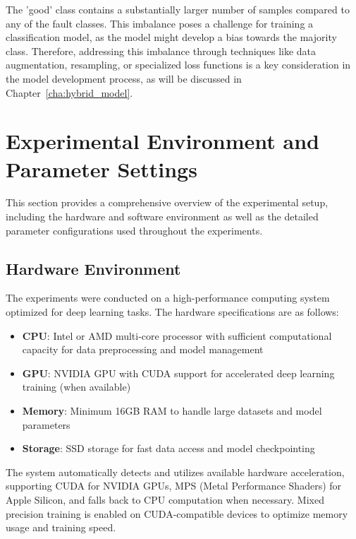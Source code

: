 The 'good' class contains a substantially larger number of samples compared to any of the fault classes. This imbalance poses a challenge for training a classification model, as the model might develop a bias towards the majority class. Therefore, addressing this imbalance through techniques like data augmentation, resampling, or specialized loss functions is a key consideration in the model development process, as will be discussed in Chapter~\ref{cha:hybrid_model}.

\section{Experimental Environment and Parameter Settings}
\label{sec:experiments:environment_parameters}

This section provides a comprehensive overview of the experimental setup, including the hardware and software environment as well as the detailed parameter configurations used throughout the experiments.

\subsection{Hardware Environment}
\label{subsec:hardware_environment}

The experiments were conducted on a high-performance computing system optimized for deep learning tasks. The hardware specifications are as follows:

\begin{itemize}
    \item \textbf{CPU}: Intel or AMD multi-core processor with sufficient computational capacity for data preprocessing and model management
    \item \textbf{GPU}: NVIDIA GPU with CUDA support for accelerated deep learning training (when available)
    \item \textbf{Memory}: Minimum 16GB RAM to handle large datasets and model parameters
    \item \textbf{Storage}: SSD storage for fast data access and model checkpointing
\end{itemize}

The system automatically detects and utilizes available hardware acceleration, supporting CUDA for NVIDIA GPUs, MPS (Metal Performance Shaders) for Apple Silicon, and falls back to CPU computation when necessary. Mixed precision training is enabled on CUDA-compatible devices to optimize memory usage and training speed.

